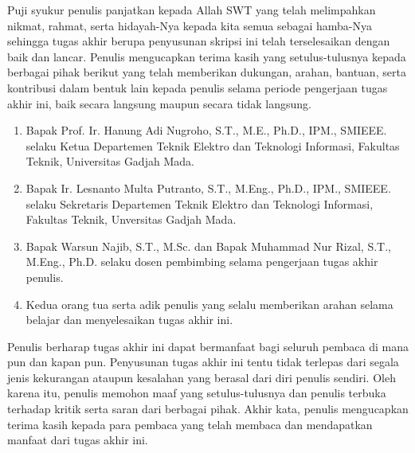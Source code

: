 Puji syukur penulis panjatkan kepada Allah SWT yang telah melimpahkan nikmat, rahmat, serta hidayah-Nya kepada kita semua sebagai hamba-Nya sehingga tugas akhir berupa penyusunan skripsi ini telah terselesaikan dengan baik dan lancar. Penulis mengucapkan terima kasih yang setulus-tulusnya kepada berbagai pihak berikut yang telah memberikan dukungan, arahan, bantuan, serta kontribusi dalam bentuk lain kepada penulis selama periode pengerjaan tugas akhir ini, baik secara langsung maupun secara tidak langsung.

\begin{enumerate}
	\item Bapak Prof. Ir. Hanung Adi Nugroho, S.T., M.E., Ph.D., IPM., SMIEEE. selaku Ketua Departemen Teknik Elektro dan Teknologi Informasi, Fakultas Teknik, Universitas Gadjah Mada.
 
	\item Bapak Ir. Lesnanto Multa Putranto, S.T., M.Eng., Ph.D., IPM., SMIEEE. selaku Sekretaris Departemen Teknik Elektro dan Teknologi Informasi, Fakultas Teknik, Unversitas Gadjah Mada.
 
        \item Bapak Warsun Najib, S.T., M.Sc. dan Bapak Muhammad Nur Rizal, S.T., M.Eng., Ph.D. selaku dosen pembimbing selama pengerjaan tugas akhir penulis.
	
	\item Kedua orang tua serta adik penulis yang selalu memberikan arahan selama belajar dan menyelesaikan tugas akhir ini.
\end{enumerate}

Penulis berharap tugas akhir ini dapat bermanfaat bagi seluruh pembaca di mana pun dan kapan pun. Penyusunan tugas akhir ini tentu tidak terlepas dari segala jenis kekurangan ataupun kesalahan yang berasal dari diri penulis sendiri. Oleh karena itu, penulis memohon maaf yang setulus-tulusnya dan penulis terbuka terhadap kritik serta saran dari berbagai pihak. Akhir kata, penulis mengucapkan terima kasih kepada para pembaca yang telah membaca dan mendapatkan manfaat dari tugas akhir ini.
